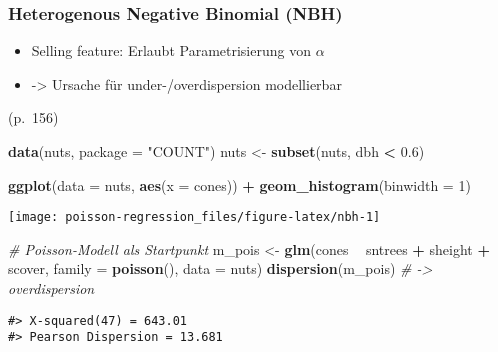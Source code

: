 \documentclass[ngerman,a4paper,]{scrartcl}
\newenvironment{Shaded}{\begin{snugshade}}{\end{snugshade}}
\newcommand{\CommentTok}[1]{\textcolor[rgb]{0.56,0.35,0.01}{\textit{#1}}}
\newcommand{\DataTypeTok}[1]{\textcolor[rgb]{0.13,0.29,0.53}{#1}}
\newcommand{\DecValTok}[1]{\textcolor[rgb]{0.00,0.00,0.81}{#1}}
\newcommand{\FloatTok}[1]{\textcolor[rgb]{0.00,0.00,0.81}{#1}}
\newcommand{\KeywordTok}[1]{\textcolor[rgb]{0.13,0.29,0.53}{\textbf{#1}}}
\newcommand{\NormalTok}[1]{#1}
\newcommand{\OperatorTok}[1]{\textcolor[rgb]{0.81,0.36,0.00}{\textbf{#1}}}
\newcommand{\StringTok}[1]{\textcolor[rgb]{0.31,0.60,0.02}{#1}}
\providecommand{\tightlist}{%
  \setlength{\itemsep}{0pt}\setlength{\parskip}{0pt}}
\theoremstyle{definition}
\theoremstyle{definition}
\theoremstyle{definition}
\theoremstyle{remark}
\begin{document}
\hypertarget{mod-nbh}{%
\subsubsection{Heterogenous Negative Binomial (NBH)}\label{mod-nbh}}

\begin{itemize}
\tightlist
\item
  Selling feature: Erlaubt Parametrisierung von \(\alpha\)
\item
  -\textgreater{} Ursache für under-/overdispersion modellierbar
\end{itemize}

\citet{hilbeModelingCountData2014} (p.~156)

\begin{Shaded}
\begin{Highlighting}[]
\KeywordTok{data}\NormalTok{(nuts, }\DataTypeTok{package =} \StringTok{"COUNT"}\NormalTok{)}
\NormalTok{nuts <-}\StringTok{ }\KeywordTok{subset}\NormalTok{(nuts, dbh }\OperatorTok{<}\StringTok{ }\FloatTok{0.6}\NormalTok{)}

\KeywordTok{ggplot}\NormalTok{(}\DataTypeTok{data =}\NormalTok{ nuts, }\KeywordTok{aes}\NormalTok{(}\DataTypeTok{x =}\NormalTok{ cones)) }\OperatorTok{+}
\StringTok{  }\KeywordTok{geom_histogram}\NormalTok{(}\DataTypeTok{binwidth =} \DecValTok{1}\NormalTok{)}
\end{Highlighting}
\end{Shaded}

\begin{center}\texttt{[image: poisson-regression\_files/figure-latex/nbh-1]} \end{center}

\begin{Shaded}
\begin{Highlighting}[]
\CommentTok{# Poisson-Modell als Startpunkt}
\NormalTok{m_pois <-}\StringTok{ }\KeywordTok{glm}\NormalTok{(cones }\OperatorTok{~}\StringTok{ }\NormalTok{sntrees }\OperatorTok{+}\StringTok{ }\NormalTok{sheight }\OperatorTok{+}\StringTok{ }\NormalTok{scover, }\DataTypeTok{family =} \KeywordTok{poisson}\NormalTok{(), }\DataTypeTok{data =}\NormalTok{ nuts) }
\KeywordTok{dispersion}\NormalTok{(m_pois) }\CommentTok{# -> overdispersion }
\end{Highlighting}
\end{Shaded}

\begin{verbatim}
#> X-squared(47) = 643.01
#> Pearson Dispersion = 13.681
\end{verbatim}
\end{document}
